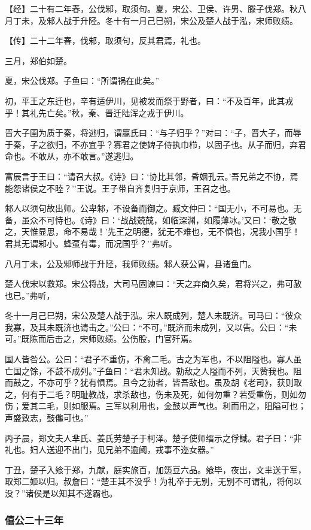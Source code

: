\documentclass[]{article}
\begin{document}
【经】二十有二年春，公伐邾，取须句。夏，宋公、卫侯、许男、滕子伐郑。秋八月丁未，及邾人战于升陉。冬十有一月己巳朔，宋公及楚人战于泓，宋师败绩。

【传】二十二年春，伐邾，取须句，反其君焉，礼也。

三月，郑伯如楚。

夏，宋公伐郑。子鱼曰：``所谓祸在此矣。''

初，平王之东迁也，辛有适伊川，见被发而祭于野者，曰：``不及百年，此其戎乎！其礼先亡矣。''秋，秦、晋迁陆浑之戎于伊川。

晋大子圉为质于秦，将逃归，谓嬴氏曰：``与子归乎？''对曰：``子，晋大子，而辱于秦，子之欲归，不亦宜乎？寡君之使婢子侍执巾栉，以固子也。从子而归，弃君命也。不敢从，亦不敢言。''遂逃归。

富辰言于王曰：``请召大叔。《诗》曰：`协比其邻，昏姻孔云。'吾兄弟之不协，焉能怨诸侯之不睦？''王说。王子带自齐复归于京师，王召之也。

邾人以须句故出师。公卑邾，不设备而御之。臧文仲曰：``国无小，不可易也。无备，虽众不可恃也。《诗》曰：`战战兢兢，如临深渊，如履薄冰。'又曰：`敬之敬之，天惟显思，命不易哉！'先王之明德，犹无不难也，无不惧也，况我小国乎！君其无谓邾小。蜂虿有毒，而况国乎？''弗听。

八月丁未，公及邾师战于升陉，我师败绩。邾人获公胄，县诸鱼门。

楚人伐宋以救郑。宋公将战，大司马固谏曰：``天之弃商久矣，君将兴之，弗可赦也已。''弗听，

冬十一月己巳朔，宋公及楚人战于泓。宋人既成列，楚人未既济。司马曰：``彼众我寡，及其未既济也请击之。''公曰：``不可。''既济而未成列，又以告。公曰：``未可。''既陈而后击之，宋师败绩。公伤股，门官歼焉。

国人皆咎公。公曰：``君子不重伤，不禽二毛。古之为军也，不以阻隘也。寡人虽亡国之馀，不鼓不成列。''子鱼曰：``君未知战。勍敌之人隘而不列，天赞我也。阻而鼓之，不亦可乎？犹有惧焉。且今之勍者，皆吾敌也。虽及胡《老司》，获则取之，何有于二毛？明耻教战，求杀敌也，伤未及死，如何勿重？若受重伤，则如勿伤；爱其二毛，则如服焉。三军以利用也，金鼓以声气也。利而用之，阻隘可也；声盛致志，鼓儳可也。''

丙子晨，郑文夫人芈氏、姜氏劳楚子于柯泽。楚子使师缙示之俘馘。君子曰：``非礼也。妇人送迎不出门，见兄弟不逾阈，戎事不迩女器。''

丁丑，楚子入飨于郑，九献，庭实旅百，加笾豆六品。飨毕，夜出，文芈送于军，取郑二姬以归。叔詹曰：``楚王其不没乎！为礼卒于无别，无别不可谓礼，将何以没？''诸侯是以知其不遂霸也。

\hypertarget{header-n894}{%
\subsubsection{僖公二十三年}\label{header-n894}}
\end{document}
